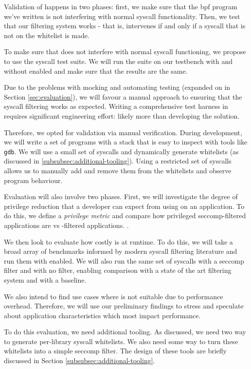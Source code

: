 Validation of \af happens in two phases: first, we make sure that the \ac{bpf}
program we've written is not interfering with normal syscall functionality. Then,
we test that our filtering system works - that is, \af intervenes if and only if
a syscall that is not on the whitelist is made.

To make sure that \af does not interfere with normal syscall functioning, we
propose to use the  syscall test suite. We will run the suite on our
testbench with and without \af enabled and make sure that the results are the
same.

Due to the problems with mocking and automating testing (expanded on in Section
\ref{sec:evaluation}), we will favour a manual approach to ensuring that the 
syscall filtering works as expected. Writing a comprehensive test harness in requires 
significant engineering effort: likely more than developing the solution. 

Therefore, we opted for validation via manual
verification. During development, we will write a set of programs with a stack 
that is easy to inspect with tools like \texttt{gdb}. We will use a small set of
syscalls and dynamically generate whitelists (as discussed in
\ref{subsubsec:additional-tooling}). Using a restricted set of syscalls allows
us to manually add and remove them from the whitelists and observe program
behaviour.

Evaluation will also involve two phases. First, we will investigate the degree
of privilege reduction that a developer can expect from using \af on an
application. To do this, we define a \textit{privilege metric} and compare how
privileged seccomp-filtered applications are vs \afss-filtered applications.
.

We then look to evaluate how costly \af is at runtime. To do this, we will take
a broad array of benchmarks informed by modern syscall filtering literature and
run them with \af enabled. We will also run the same set of syscalls with a
seccomp filter and with no filter, enabling comparison with a state of the art
filtering system and with a baseline.

We also intend to find use cases where \af is not suitable due to performance
overhead. Therefore, we will use our preliminary findings to stress \af and
speculate about application characteristics which most impact performance.

To do this evaluation, we need additional tooling. As discussed, we need two
way to generate per-library syscall whitelists. We also need some way to turn
these whitelists into a simple seccomp filter. The design of these tools are
briefly discussed in Section \ref{subsubsec:additional-tooling}.

